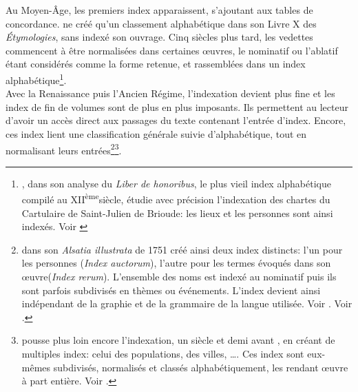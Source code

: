 Au Moyen-Âge, les premiers index apparaissent, s'ajoutant aux tables de concordance.  ne créé qu'un classement alphabétique dans son Livre X des \textit{Étymologies}, sans indexé son ouvrage. Cinq siècles plus tard, les vedettes commencent à être normalisées dans certaines œuvres, le nominatif ou l'ablatif étant considérés comme la forme retenue, et rassemblées dans un index alphabétique\footnote{, dans son analyse du \textit{Liber de honoribus}, le plus vieil index alphabétique compilé au \textsc{XII}\textsuperscript{ème}siècle, étudie avec précision l'indexation des chartes du Cartulaire de Saint-Julien de Brioude: les lieux et les personnes sont ainsi indexés. Voir \cite[pp.97 et suivantes]{berger_indexation_2006}}.\\

Avec la Renaissance puis l'Ancien Régime, l'indexation devient plus fine et les index de fin de volumes sont de plus en plus imposants. Ils permettent au lecteur d'avoir un accès direct aux passages du texte contenant l'entrée d'index. Encore, ces index lient une classification générale suivie d'alphabétique, tout en normalisant leurs entrées\footnote{ dans son \textit{Alsatia illustrata} de 1751 créé ainsi deux index distincts: l'un pour les personnes (\textit{Index auctorum}), l'autre pour les termes évoqués dans son œuvre(\textit{Index rerum}). L'ensemble des noms est indexé au nominatif puis ils sont parfois subdivisés en thèmes ou événements. L'index devient ainsi indépendant de la graphie et de la grammaire de la langue utilisée. Voir \cite{schoepflin_alsatia_1751}. Voir .}\footnote{ pousse plus loin encore l'indexation, un siècle et demi avant , en créant de multiples index: celui des populations, des villes, \dots. Ces index sont eux-mêmes subdivisés, normalisés et classés alphabétiquement, les rendant œuvre à part entière. Voir \cite{estienne_thesaurus_1573}.}.